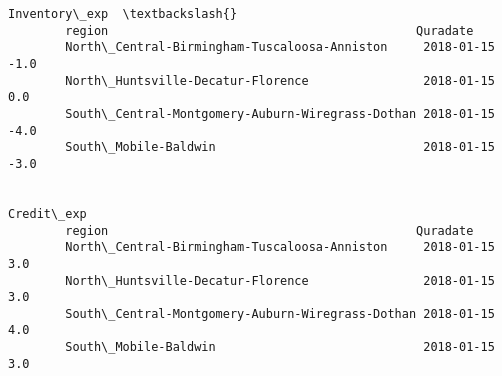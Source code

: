 \documentclass[11pt]{article}
\begin{document}
\begin{Verbatim}[commandchars=\\\{\}]
                                                                     Inventory\_exp  \textbackslash{}
        region                                           Quradate                    
        North\_Central-Birmingham-Tuscaloosa-Anniston     2018-01-15           -1.0   
        North\_Huntsville-Decatur-Florence                2018-01-15            0.0   
        South\_Central-Montgomery-Auburn-Wiregrass-Dothan 2018-01-15           -4.0   
        South\_Mobile-Baldwin                             2018-01-15           -3.0   
        
                                                                     Credit\_exp  
        region                                           Quradate                
        North\_Central-Birmingham-Tuscaloosa-Anniston     2018-01-15         3.0  
        North\_Huntsville-Decatur-Florence                2018-01-15         3.0  
        South\_Central-Montgomery-Auburn-Wiregrass-Dothan 2018-01-15         4.0  
        South\_Mobile-Baldwin                             2018-01-15         3.0  
\end{Verbatim}
            
\end{document}
